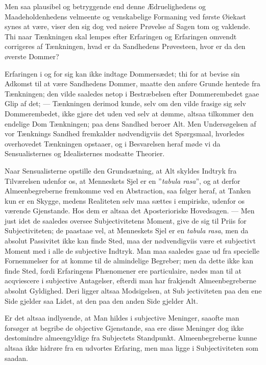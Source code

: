 \documentclass[12pt]{book}
\newcommand{\opage}[1]{\marginnote{\footnotesize\textit{[#1]}}}
\begin{document}
Men saa plausibel og betryggende end denne Ædruelighedens og
Maadeholdenhedens velmeente og venskabelige Formaning ved første Øiekast synes
at være, viser den sig dog ved nøiere Prøvelse af Sagen tom og vaklende. Thi
naar
\opage{2} Tænkningen skal lempes efter Erfaringen og Erfaringen omvendt corrigeres af
Tænkningen, hvad er da Sandhedens Prøvesteen, hvor er da den øverste Dommer?

Erfaringen i og for sig kan ikke indtage Dommersædet; thi for at bevise sin
Adkomst til at være Sandhedens Dommer, maatte den anføre Grunde hentede fra
Tænkningen; den vilde saaledes netop i Bestræbelsen efter Dommerembedet gaae
Glip af det; --- Tænkningen derimod kunde, selv om den vilde frasige sig selv
Dommerembedet, ikke gjøre det uden ved selv at dømme, altsaa tilkommer den
endelige Dom Tænkningen; paa dens Sandhed beroer Alt. Men Undersøgelsen af vor
Tænknings Sandhed fremkalder nødvendigviis det Spørgsmaal, hvorledes
overhovedet Tænkningen opstaaer, og i Besvarelsen heraf møde vi da
Sensualisternes og Idealisternes modsatte Theorier.

Naar Sensualisterne opstille den Grundsætning, at Alt skyldes Indtryk fra
Tilværelsen udenfor os, at Menneskets Sjel er en ”\textit{tabula rasa}”, og at
derfor Almeenbegreberne fremkomme ved en Abstraction, saa følger heraf, at
Tanken kun er en Skygge, medens Realiteten selv maa sættes i empiriske,
udenfor os værende Gjenstande. Hos dem er altsaa det Aposterioriske
Hovedsagen. --- Men just idet de saaledes oversee Subjectivitetens Moment,
give de sig til Priis for Subjectiviteten; de paastaae vel, at Menneskets Sjel
er en \textit{tabula rasa}, men da absolut Passivitet ikke kan finde Sted, maa
der nødvendigviis være et subjectivt Moment med i alle de subjective Indtryk.
Man maa saaledes gaae ud fra specielle Fornemmelser for at komme til de
almindelige Begreber; men da dette ikke kan finde Sted, fordi Erfaringens
Phænomener ere particulaire, nødes man til at acqviescere i subjective
Antagelser, efterdi man har frakjendt Almeenbegreberne absolnt Gyldighed. Deri
ligger altsaa Modsigelsen, at Sub\-%
\opage{3}jectiviteten paa den ene Side gjelder saa Lidet, at den paa den anden Side
gjelder Alt.

Er det altsaa indlysende, at Man hildes i subjective Meninger, saaofte man
forsøger at begribe de objective Gjenstande, saa ere disse Meninger dog ikke
destomindre almeengyldige fra Subjectets Standpunkt. Almeenbegreberne kunne
altsaa ikke hidrøre fra en udvortes Erfaring, men maa ligge i Subjectiviteten
som saadan.
\end{document}
